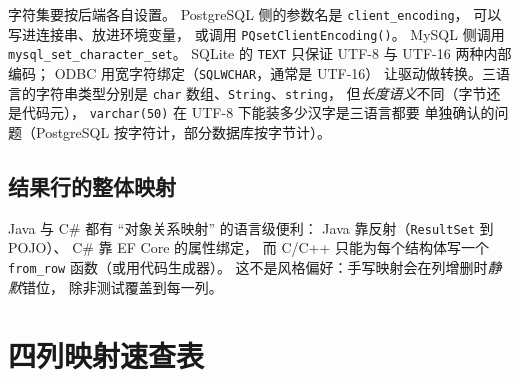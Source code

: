 \documentclass[12pt,a4paper,fontset=fandol]{ctexbook}
\newcommand{\Fn}[1]{\texttt{#1()}}
\newcommand{\Tp}[1]{\texttt{#1}}
\newcommand{\CSharp}{C\#}
\newcommand{\CppJava}{C/C++}
\begin{document}
字符集要按后端各自设置。
PostgreSQL 侧的参数名是 \texttt{client\allowbreak\_encoding}，
可以写进连接串、放进环境变量，
或调用 \Fn{PQset\allowbreak ClientEncoding}。
MySQL 侧调用 \texttt{mysql\_set\allowbreak \_character\_set}。
SQLite 的 \texttt{TEXT} 只保证 UTF-8 与 UTF-16 两种内部编码；
ODBC 用宽字符绑定（\Tp{SQLWCHAR}，通常是 UTF-16）
让驱动做转换。三语言的字符串类型分别是
\Tp{char} 数组、\Tp{String}、\Tp{string}，
但\emph{长度语义}不同（字节还是代码元），
\texttt{varchar(50)} 在 UTF-8 下能装多少汉字是三语言都要
单独确认的问题（PostgreSQL 按字符计，部分数据库按字节计）。

\subsection{结果行的整体映射}

Java 与 \CSharp{} 都有 ``对象关系映射'' 的语言级便利：
Java 靠反射（\Tp{ResultSet} 到 POJO）、
\CSharp{} 靠 EF Core 的属性绑定，
而 \CppJava{} 只能为每个结构体写一个
\texttt{from\_row} 函数（或用代码生成器）。
这不是风格偏好：手写映射会在列增删时\emph{静默}错位，
除非测试覆盖到每一列。

\section{四列映射速查表}
\end{document}
